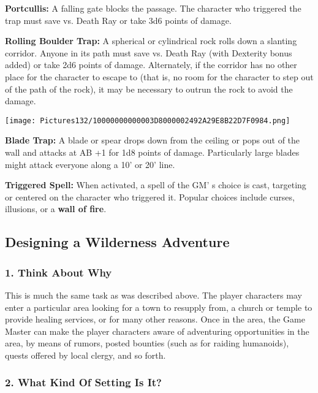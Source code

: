 \documentclass[a4paper,twoside,openany,10pt]{book}
\begin{document}
\begin{multicols}{2}
\textbf{Portcullis:} A falling gate blocks the passage. The character who triggered the trap must save vs. Death Ray or take 3d6 points of damage.

\textbf{Rolling Boulder Trap:} A spherical or cylindrical rock rolls down a slanting corridor. Anyone in its path must save vs. Death Ray (with Dexterity bonus added) or take 2d6 points of damage. Alternately, if the corridor has no other place for the character to escape to (that is, no room for the character to step out of the path of the rock), it may be necessary to outrun the rock to avoid the damage.

\begin{center}
	\texttt{[image: Pictures132/10000000000003D8000002492A29E8B22D7F0984.png]}
\end{center}

\textbf{Blade Trap:} A blade or spear drops down from the ceiling or pops out of the wall and attacks at AB +1 for 1d8 points of damage. Particularly large blades might attack everyone along a 10' or 20' line.

\textbf{Triggered Spell:} When activated, a spell of the GM' s choice is cast, targeting or centered on the character who triggered it. Popular choices include curses, illusions, or a \textbf{wall of fire}.

\subsection{Designing a Wilderness Adventure}\label{designing-a-wilderness-adventure}

\subsubsection{1. Think About Why}\label{think-about-why-1}

This is much the same task as was described above. The player characters may enter a particular area looking for a town to resupply from, a church or temple to provide healing services, or for many other reasons. Once in the area, the Game Master can make the player characters aware of adventuring opportunities in the area, by means of rumors, posted bounties (such as for raiding humanoids), quests offered by local clergy, and so forth.

\subsubsection{2. What Kind Of Setting Is It?}\label{what-kind-of-setting-is-it-1}


\end{multicols}
\end{document}
